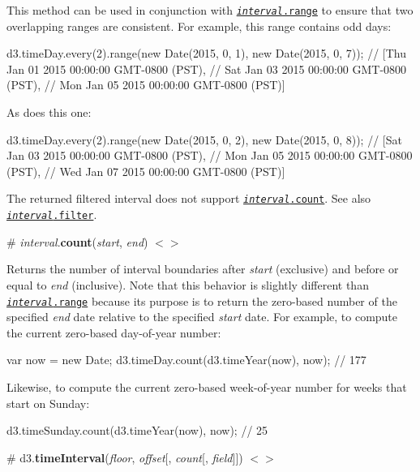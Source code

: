 This method can be used in conjunction with \href{#interval_range}{\tt {\itshape interval}.range} to ensure that two overlapping ranges are consistent. For example, this range contains odd days\+:


\begin{DoxyCode}
d3.timeDay.every(2).range(new Date(2015, 0, 1), new Date(2015, 0, 7));
// [Thu Jan 01 2015 00:00:00 GMT-0800 (PST),
//  Sat Jan 03 2015 00:00:00 GMT-0800 (PST),
//  Mon Jan 05 2015 00:00:00 GMT-0800 (PST)]
\end{DoxyCode}


As does this one\+:


\begin{DoxyCode}
d3.timeDay.every(2).range(new Date(2015, 0, 2), new Date(2015, 0, 8));
// [Sat Jan 03 2015 00:00:00 GMT-0800 (PST),
//  Mon Jan 05 2015 00:00:00 GMT-0800 (PST),
//  Wed Jan 07 2015 00:00:00 GMT-0800 (PST)]
\end{DoxyCode}


The returned filtered interval does not support \href{#interval_count}{\tt {\itshape interval}.count}. See also \href{#interval_filter}{\tt {\itshape interval}.filter}.

\label{_interval_count}%
\# {\itshape interval}.{\bfseries count}({\itshape start}, {\itshape end}) \href{https://github.com/d3/d3-time/blob/master/src/interval.js#L44}{\tt $<$$>$}

Returns the number of interval boundaries after {\itshape start} (exclusive) and before or equal to {\itshape end} (inclusive). Note that this behavior is slightly different than \href{#interval_range}{\tt {\itshape interval}.range} because its purpose is to return the zero-\/based number of the specified {\itshape end} date relative to the specified {\itshape start} date. For example, to compute the current zero-\/based day-\/of-\/year number\+:


\begin{DoxyCode}
var now = new Date;
d3.timeDay.count(d3.timeYear(now), now); // 177
\end{DoxyCode}


Likewise, to compute the current zero-\/based week-\/of-\/year number for weeks that start on Sunday\+:


\begin{DoxyCode}
d3.timeSunday.count(d3.timeYear(now), now); // 25
\end{DoxyCode}


\label{_timeInterval}%
\# d3.{\bfseries time\+Interval}({\itshape floor}, {\itshape offset}\mbox{[}, {\itshape count}\mbox{[}, {\itshape field}\mbox{]}\mbox{]}) \href{https://github.com/d3/d3-time/blob/master/src/interval.js#L4}{\tt $<$$>$}

